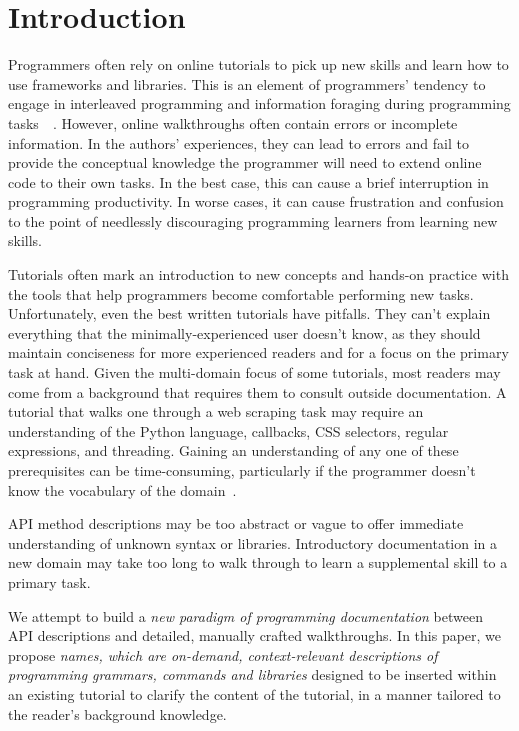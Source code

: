 \section{Introduction}

Programmers often rely on online tutorials to pick up new skills and learn how to use frameworks and libraries.
This is an element of programmers' tendency to engage in interleaved programming and information foraging during programming tasks~\cite{brandt_two_2009}~\cite{brandt_example-centric_2010}.
However, online walkthroughs often contain errors or incomplete information.
In the authors' experiences, they can lead to errors and fail to provide the conceptual knowledge the programmer will need to extend online code to their own tasks.
In the best case, this can cause a brief interruption in programming productivity.
In worse cases, it can cause frustration and confusion to the point of needlessly discouraging programming learners from learning new skills.

Tutorials often mark an introduction to new concepts and hands-on practice with the tools that help programmers become comfortable performing new tasks.
Unfortunately, even the best written tutorials have pitfalls.
They can't explain everything that the minimally-experienced user doesn't know, as they should maintain conciseness for more experienced readers and for a focus on the primary task at hand.
Given the multi-domain focus of some tutorials, most readers may come from a background that requires them to consult outside documentation.
A tutorial that walks one through a web scraping task may require an understanding of the Python language, callbacks, CSS selectors, regular expressions, and threading.
Gaining an understanding of any one of these prerequisites can be time-consuming, particularly if the programmer doesn't know the vocabulary of the domain~\cite{furnas_vocabulary_1987}. 

API method descriptions may be too abstract or vague to offer immediate understanding of unknown syntax or libraries.
Introductory documentation in a new domain may take too long to walk through to learn a supplemental skill to a primary task.

We attempt to build a \emph{new paradigm of programming documentation} between API descriptions and detailed, manually crafted walkthroughs.
In this paper, we propose \emph{\Glspl{name}, which are on-demand, context-relevant descriptions of programming grammars, commands and libraries} designed to be inserted within an existing tutorial to clarify the content of the tutorial, in a manner tailored to the reader's background knowledge.

